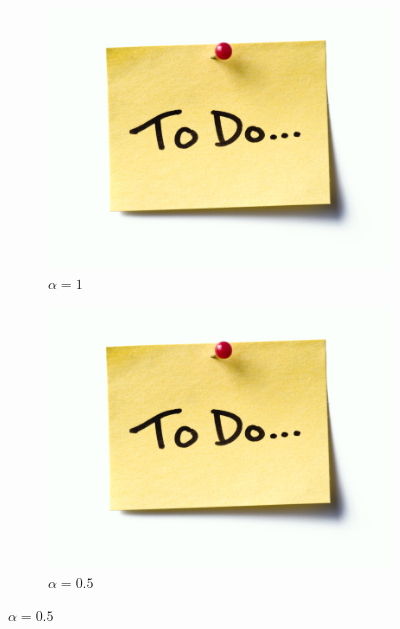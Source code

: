             \begin{figure}
                \centering
                
                \begin{subfigure}[b]{0.32\textwidth}
                    \centering
                    \includegraphics[width=\textwidth]{figures/todo.jpg}
                    \caption{$\alpha=1$}
                \end{subfigure}
                \begin{subfigure}[b]{0.32\textwidth}
                    \centering
                    \includegraphics[width=\textwidth]{figures/todo.jpg}
                    \caption{$\alpha=0.5$}
                \end{subfigure}

\end{figure}
